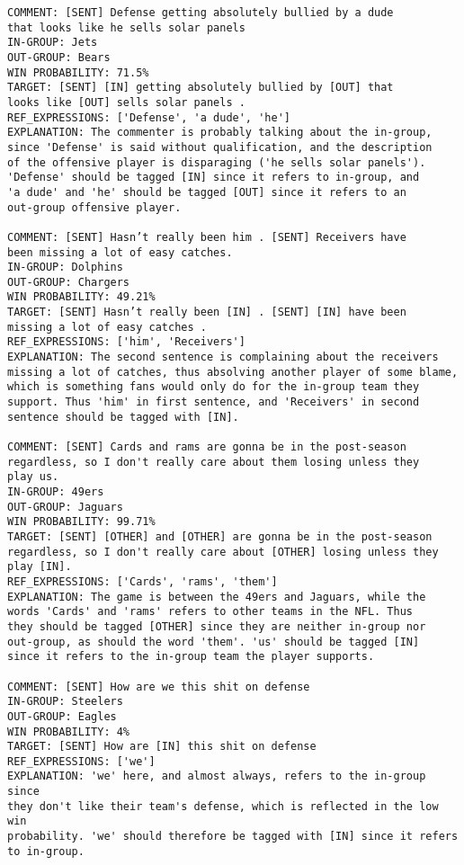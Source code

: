 \begin{verbatim}
COMMENT: [SENT] Defense getting absolutely bullied by a dude 
that looks like he sells solar panels
IN-GROUP: Jets
OUT-GROUP: Bears
WIN PROBABILITY: 71.5%
TARGET: [SENT] [IN] getting absolutely bullied by [OUT] that 
looks like [OUT] sells solar panels .
REF_EXPRESSIONS: ['Defense', 'a dude', 'he']
EXPLANATION: The commenter is probably talking about the in-group, 
since 'Defense' is said without qualification, and the description 
of the offensive player is disparaging ('he sells solar panels'). 
'Defense' should be tagged [IN] since it refers to in-group, and 
'a dude' and 'he' should be tagged [OUT] since it refers to an 
out-group offensive player.

COMMENT: [SENT] Hasn’t really been him . [SENT] Receivers have 
been missing a lot of easy catches.
IN-GROUP: Dolphins
OUT-GROUP: Chargers
WIN PROBABILITY: 49.21%
TARGET: [SENT] Hasn’t really been [IN] . [SENT] [IN] have been 
missing a lot of easy catches .
REF_EXPRESSIONS: ['him', 'Receivers']
EXPLANATION: The second sentence is complaining about the receivers 
missing a lot of catches, thus absolving another player of some blame, 
which is something fans would only do for the in-group team they 
support. Thus 'him' in first sentence, and 'Receivers' in second 
sentence should be tagged with [IN].

COMMENT: [SENT] Cards and rams are gonna be in the post-season 
regardless, so I don't really care about them losing unless they 
play us.
IN-GROUP: 49ers
OUT-GROUP: Jaguars
WIN PROBABILITY: 99.71%
TARGET: [SENT] [OTHER] and [OTHER] are gonna be in the post-season 
regardless, so I don't really care about [OTHER] losing unless they 
play [IN].
REF_EXPRESSIONS: ['Cards', 'rams', 'them']
EXPLANATION: The game is between the 49ers and Jaguars, while the 
words 'Cards' and 'rams' refers to other teams in the NFL. Thus 
they should be tagged [OTHER] since they are neither in-group nor 
out-group, as should the word 'them'. 'us' should be tagged [IN] 
since it refers to the in-group team the player supports.

COMMENT: [SENT] How are we this shit on defense
IN-GROUP: Steelers
OUT-GROUP: Eagles
WIN PROBABILITY: 4%
TARGET: [SENT] How are [IN] this shit on defense
REF_EXPRESSIONS: ['we']
EXPLANATION: 'we' here, and almost always, refers to the in-group since 
they don't like their team's defense, which is reflected in the low win 
probability. 'we' should therefore be tagged with [IN] since it refers 
to in-group.


\end{verbatim}
